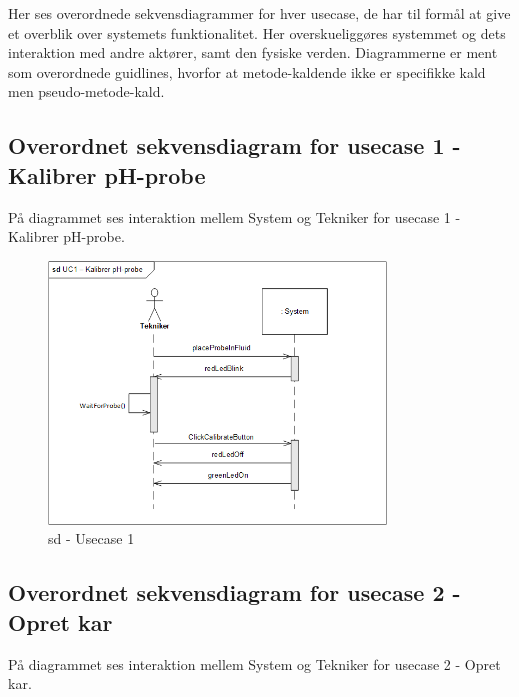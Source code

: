 
Her ses overordnede sekvensdiagrammer for hver usecase, de har til formål at give et overblik over systemets funktionalitet. Her overskueliggøres systemmet og dets interaktion med andre aktører, samt den fysiske verden.
Diagrammerne er ment som overordnede guidlines, hvorfor at metode-kaldende ikke er specifikke kald men pseudo-metode-kald. 

\subsection*{Overordnet sekvensdiagram for usecase 1 - Kalibrer pH-probe}
På diagrammet ses interaktion mellem System og Tekniker for usecase 1 - Kalibrer pH-probe.

\begin{figure}[H]
    \centering
    \includegraphics[width=0.8\textwidth]{Systemarkitektur/OverordnedeSekvensdiagrammer/sd_UC1.png}
    \caption{sd - Usecase 1}
    \label{fig:sd_UC1}
\end{figure}

\subsection*{Overordnet sekvensdiagram for usecase 2 - Opret kar}
På diagrammet ses interaktion mellem System og Tekniker for usecase 2 - Opret kar.

